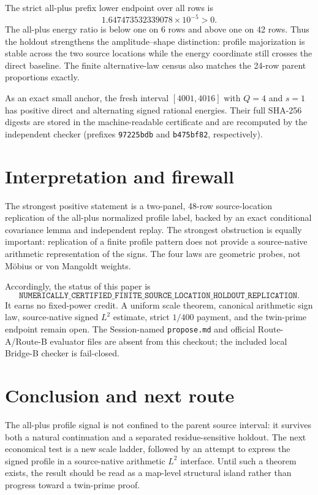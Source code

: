 \documentclass[10pt]{article}
\begin{document}
The strict all-plus prefix lower endpoint over all rows is
\[
 1.647473532339078\times 10^{-5}>0.
\]
The all-plus energy ratio is below one on 6 rows and above one on 42 rows.
Thus the holdout strengthens the amplitude--shape distinction: profile
majorization is stable across the two source locations while the energy
coordinate still crosses the direct baseline.  The finite alternative-law
census also matches the 24-row parent proportions exactly.

As an exact small anchor, the fresh interval $[4001,4016]$ with $Q=4$ and
$s=1$ has positive direct and alternating signed rational energies.  Their
full SHA-256 digests are stored in the machine-readable certificate and are
recomputed by the independent checker (prefixes
\texttt{97225bdb} and \texttt{b475bf82}, respectively).

\section{Interpretation and firewall}

The strongest positive statement is a two-panel, 48-row source-location
replication of the all-plus normalized profile label, backed by an exact
conditional covariance lemma and independent replay.  The strongest
obstruction is equally important: replication of a finite profile pattern
does not provide a source-native arithmetic representation of the signs.
The four laws are geometric probes, not Möbius or von Mangoldt weights.

Accordingly, the status of this paper is
\[
\texttt{NUMERICALLY\_CERTIFIED\_FINITE\_SOURCE\_LOCATION\_HOLDOUT\_REPLICATION}.
\]
It earns no fixed-power credit.  A uniform scale theorem, canonical
arithmetic sign law, source-native signed $L^2$ estimate, strict $1/400$
payment, and the twin-prime endpoint remain open.  The Session-named
\texttt{propose.md} and official Route-A/Route-B evaluator files are absent
from this checkout; the included local Bridge-B checker is fail-closed.

\section{Conclusion and next route}

The all-plus profile signal is not confined to the parent source interval:
it survives both a natural continuation and a separated residue-sensitive
holdout.  The next economical test is a new scale ladder, followed by an
attempt to express the signed profile in a source-native arithmetic $L^2$
interface.  Until such a theorem exists, the result should be read as a
map-level structural island rather than progress toward a twin-prime proof.



\end{document}

